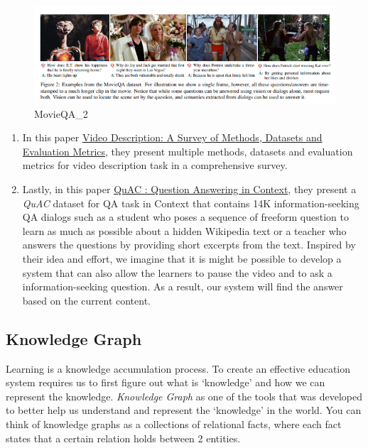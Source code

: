 \documentclass{acm_proc_article-sp}
\begin{document}
\begin{figure}
\centering
\includegraphics{img/movieqa2.png}
\caption{MovieQA\_2}
\end{figure}

\begin{enumerate}
\def\labelenumi{\arabic{enumi}.}
\setcounter{enumi}{4}
\item
  In this paper \href{https://arxiv.org/pdf/1806.00186.pdf}{Video
  Description: A Survey of Methods, Datasets and Evaluation Metrics},
  they present multiple methods, datasets and evaluation metrics for
  video description task in a comprehensive survey.
\item
  Lastly, in this paper \href{https://arxiv.org/pdf/1808.07036.pdf}{QuAC
  : Question Answering in Context}, they present a \emph{QuAC} dataset
  for QA task in Context that contains 14K information-seeking QA
  dialogs such as a student who poses a sequence of freeform question to
  learn as much as possible about a hidden Wikipedia text or a teacher
  who answers the questions by providing short excerpts from the text.
  Inspired by their idea and effort, we imagine that it is might be
  possible to develop a system that can also allow the learners to pause
  the video and to ask a information-seeking question. As a result, our
  system will find the answer based on the current content.
\end{enumerate}

\subsection{Knowledge Graph}\label{knowledge-graph}

Learning is a knowledge accumulation process. To create an effective
education system requires us to first figure out what is `knowledge' and
how we can represent the knowledge. \emph{Knowledge Graph} as one of the
tools that was developed to better help us understand and represent the
`knowledge' in the world. You can think of knowledge graphs as a
collections of relational facts, where each fact states that a certain
relation holds between 2 entities.
\end{document}
